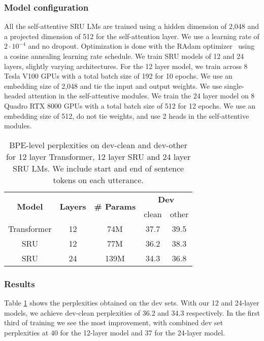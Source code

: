 \documentclass[a4paper]{article}
\begin{document}
\subsubsection{Model configuration}
All the self-attentive SRU LMs are trained using a hidden dimension of 2,048 and a projected dimension of 512 for the self-attention layer. We use a learning rate of $2\cdot 10^{-4}$ and no dropout. Optimization is done with the RAdam optimizer~\cite{liu2019radam} using a cosine annealing learning rate schedule. We train SRU models of 12 and 24 layers, slightly varying architectures. For the 12 layer model, we train across 8 Tesla V100 GPUs with a total batch size of 192 for 10 epochs. We use an embedding size of 2,048 and tie the input and output weights. We use single-headed attention in the self-attentive modules. We train the 24 layer model on 8 Quadro RTX 8000 GPUs with a total batch size of 512 for 12 epochs. We use an embedding size of 512, do not tie weights, and use 2 heads in the self-attentive modules.

\begin{table}[t]
\centering
\begin{tabular}{c|c|c|c|c}
\hline
\multirow{2}{*}{\textbf{Model}} & \multirow{2}{*}{\textbf{Layers}} & \multirow{2}{*}{\textbf{\# Params}} &\multicolumn{2}{c}{\textbf{Dev}} \\
\cline{4-5}
& & & clean & other \\
\hline
Transformer & 12 & 74M & 37.7 & 39.5 \\
\hline
SRU & 12 & 77M & 36.2 & 38.3 \\
\hline
SRU & 24 & 139M & 34.3 & 36.8 \\
\hline
\end{tabular}
\vspace{1em}
\caption{BPE-level perplexities on dev-clean and dev-other for 12 layer Transformer, 12 layer SRU and 24 layer SRU LMs. We include start and end of sentence tokens on each utterance.}
\label{table:lm_ppl}
\vspace{-5mm}
\end{table}

\subsubsection{Results}
Table \ref{table:lm_ppl} shows the perplexities obtained on the dev sets. With our 12 and 24-layer models, we achieve dev-clean perplexities of 36.2 and 34.3 respectively. In the first third of training we see the most improvement, with combined dev set perplexities at 40 for the 12-layer model and 37 for the 24-layer model.
\end{document}
